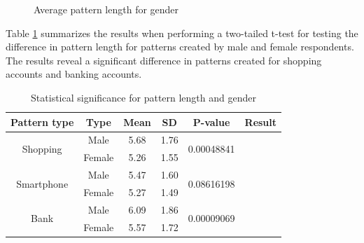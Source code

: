     \begin{figure}[H]
    	\centering
    	\caption{Average pattern length for gender}
    	\label{fig:avgpatternlengthgender}
    \end{figure}

    Table \ref{tab:statsigLengthGender} summarizes the results when performing a two-tailed t-test for testing the difference in pattern length for patterns created by male and female respondents. The results reveal a significant difference in patterns created for shopping accounts and banking accounts. 

    \begin{table}[H]
      \centering
      \begin{tabular}{ c | c | c | c | c | c }
      \hline
        {\bf Pattern type} & {\bf Type} & {\bf Mean} & {\bf SD} & {\bf P-value} & {\bf Result} \\ \hline
        \multirow{2}{*}{Shopping}   & Male    & 5.68 & 1.76 & \multirow{2}{*}{0.00048841} & \multirow{2}{*}{\bf \color{olive}{Significant}} \\
                                    & Female  & 5.26 & 1.55 & & \\ \hline
        \multirow{2}{*}{Smartphone} & Male    & 5.47 & 1.60 & \multirow{2}{*}{0.08616198} & \multirow{2}{*}{\bf \color{red}{Not significant}} \\
                                    & Female  & 5.27 & 1.49 & & \\ \hline
        \multirow{2}{*}{Bank}       & Male    & 6.09 & 1.86 & \multirow{2}{*}{0.00009069} & \multirow{2}{*}{\bf \color{olive}{Significant}} \\
                                    & Female  & 5.57 & 1.72 & & \\ \hline
      \end{tabular}
      \caption{Statistical significance for pattern length and gender}
      \label{tab:statsigLengthGender}
    \end{table}

